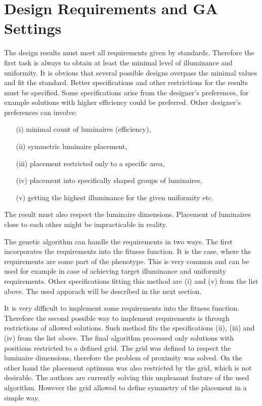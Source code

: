 \section{Design Requirements and GA Settings}
The design results must meet all requirements given by standards. Therefore the first task is always to obtain at least the minimal level of illuminance and uniformity. It is obvious that several possible designs overpass the minimal values and fit the standard. Better specifications and other restrictions for the results must be specified. Some specifications arise from the designer's preferences, for example solutions with higher efficiency could be preferred. Other designer's preferences can involve:

\begin{enumerate}
	\item[(i)] minimal count of luminaires (efficiency),
	\item[(ii)] symmetric luminaire placement,
	\item[(iii)] placement restricted only to a specific area,
	\item[(iv)] placement into specifically shaped groups of luminaires,
	\item[(v)] getting the highest illuminance for the given uniformity etc.
\end{enumerate}

The result must also respect the luminaire dimensions. Placement of luminaires close to each other might be impracticable in reality.

The genetic algorithm can handle the requirements in two ways. The first incorporates the requirements into the fitness function. It is the case, where the requirements are some part of the phenotype. This is very common and can be used for example in case of achieving target illuminance and uniformity requirements. Other specifications fitting this method are (i) and (v) from the list above. The used apporach will be described in the next section. 

It is very difficult to implement some requirements into the fitness function. Therefore the second possible way to implement requirements is through restrictions of allowed solutions. Such method fits the specifications (ii), (iii) and (iv) from the list above. The final algorithm processed only solutions with positions restricted to a defined grid. The grid was defined to respect the luminaire dimensions, therefore the problem of proximity was solved. On the other hand the placement optimum was also restricted by the grid, which is not desirable. The authors are currently solving this unpleasant feature of the used algorithm. However the grid allowed to define symmetry of the placement in a simple way.

